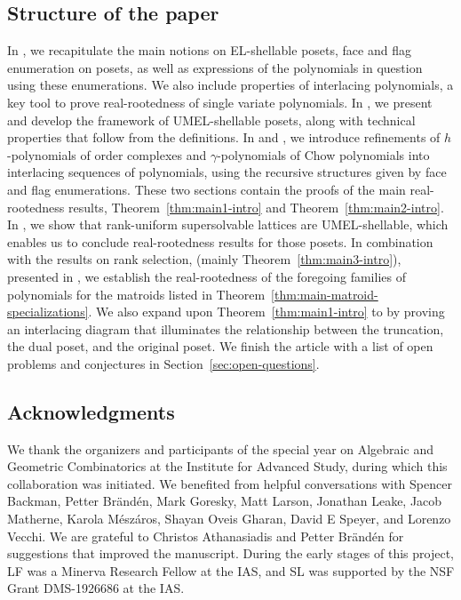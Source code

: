 \documentclass[11pt,a4paper]{amsart}
\theoremstyle{results}
\theoremstyle{definitions}
\begin{document}
\subsection{Structure of the paper} 
In , we recapitulate the main notions on EL-shellable posets, face and flag enumeration on posets, as well as expressions of the polynomials in question using these enumerations. We also include properties of interlacing polynomials, a key tool to prove real-rootedness of single variate polynomials. In , we present and develop the framework of UMEL-shellable posets, along with technical properties that follow from the definitions. In  and , we introduce refinements of $h$-polynomials of order complexes and $\gamma$-polynomials of Chow polynomials into interlacing sequences of polynomials, using the recursive structures given by face and flag enumerations. These two sections contain the proofs of the main real-rootedness results, Theorem~\ref{thm:main1-intro} and Theorem~\ref{thm:main2-intro}. In , we show that rank-uniform supersolvable lattices are UMEL-shellable, which enables us to conclude real-rootedness results for those posets. In combination with the results on rank selection, (mainly Theorem~\ref{thm:main3-intro}), presented in , we establish the real-rootedness of the foregoing families of polynomials for the matroids listed in Theorem~\ref{thm:main-matroid-specializations}. We also expand upon Theorem~\ref{thm:main1-intro} to  by proving an interlacing diagram that illuminates the relationship between the truncation, the dual poset, and the original poset.  We finish the article with a list of open problems and conjectures in Section~\ref{sec:open-questions}.
\subsection*{Acknowledgments} 

We thank the organizers and participants of the special year on Algebraic and Geometric Combinatorics at the Institute for Advanced Study, during which this collaboration was initiated. We benefited from helpful conversations with Spencer Backman, Petter Br\"{a}nd\'{e}n, Mark Goresky, Matt Larson, Jonathan Leake, Jacob Matherne, Karola M\'{e}sz\'{a}ros, Shayan Oveis Gharan, David E Speyer, and Lorenzo Vecchi. We are grateful to Christos Athanasiadis and Petter Br\"{a}nd\'{e}n for suggestions that improved the manuscript. During the early stages of this project, LF was a Minerva Research Fellow at the IAS, and SL was supported by the NSF Grant DMS-1926686 at the IAS. 
\end{document}
